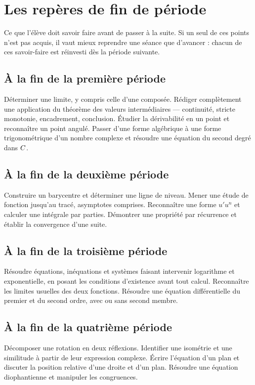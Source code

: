 \section*{Les repères de fin de période}

Ce que l'élève doit savoir faire avant de passer à la suite. Si un seul de ces
points n'est pas acquis, il vaut mieux reprendre une séance que d'avancer :
chacun de ces savoir-faire est réinvesti dès la période suivante.

\subsection*{À la fin de la première période}

Déterminer une limite, y compris celle d'une composée. Rédiger complètement
une application du théorème des valeurs intermédiaires — continuité, stricte
monotonie, encadrement, conclusion. Étudier la dérivabilité en un point et
reconnaître un point angulé. Passer d'une forme algébrique à une forme
trigonométrique d'un nombre complexe et résoudre une équation du second degré
dans $C$.

\subsection*{À la fin de la deuxième période}

Construire un barycentre et déterminer une ligne de niveau. Mener une étude de
fonction jusqu'au tracé, asymptotes comprises. Reconnaître une forme
$u'u^{n}$ et calculer une intégrale par parties. Démontrer une propriété par
récurrence et établir la convergence d'une suite.

\subsection*{À la fin de la troisième période}

Résoudre équations, inéquations et systèmes faisant intervenir logarithme et
exponentielle, en posant les conditions d'existence avant tout calcul.
Reconnaître les limites usuelles des deux fonctions. Résoudre une équation
différentielle du premier et du second ordre, avec ou sans second membre.

\subsection*{À la fin de la quatrième période}

Décomposer une rotation en deux réflexions. Identifier une isométrie et une
similitude à partir de leur expression complexe. Écrire l'équation d'un plan
et discuter la position relative d'une droite et d'un plan. Résoudre une
équation diophantienne et manipuler les congruences.

